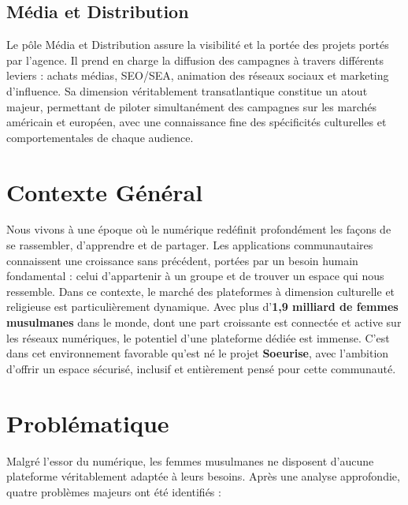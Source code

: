 \documentclass[12pt,a4paper]{report}
\begin{document}
	\subsection{Média et Distribution}
	
	Le pôle Média et Distribution assure la visibilité et la portée des projets portés par 
	l'agence. Il prend en charge la diffusion des campagnes à travers différents leviers : 
	achats médias, SEO/SEA, animation des réseaux sociaux et marketing d'influence. Sa 
	dimension véritablement transatlantique constitue un atout majeur, permettant de piloter 
	simultanément des campagnes sur les marchés américain et européen, avec une connaissance 
	fine des spécificités culturelles et comportementales de chaque audience.
	
	\section{Contexte Général}
	
	Nous vivons à une époque où le numérique redéfinit profondément les façons de se 
	rassembler, d'apprendre et de partager. Les applications communautaires connaissent 
	une croissance sans précédent, portées par un besoin humain fondamental : celui 
	d'appartenir à un groupe et de trouver un espace qui nous ressemble. Dans ce contexte, 
	le marché des plateformes à dimension culturelle et religieuse est particulièrement 
	dynamique. Avec plus d'\textbf{1,9 milliard de femmes musulmanes} dans le monde, 
	dont une part croissante est connectée et active sur les réseaux numériques, le 
	potentiel d'une plateforme dédiée est immense. C'est dans cet environnement favorable 
	qu'est né le projet \textbf{Soeurise}, avec l'ambition d'offrir un espace sécurisé, 
	inclusif et entièrement pensé pour cette communauté.
	
	\section{Problématique}
	
	Malgré l'essor du numérique, les femmes musulmanes ne disposent d'aucune plateforme 
	véritablement adaptée à leurs besoins. Après une analyse approfondie, quatre problèmes 
	majeurs ont été identifiés :
	
\end{document}
